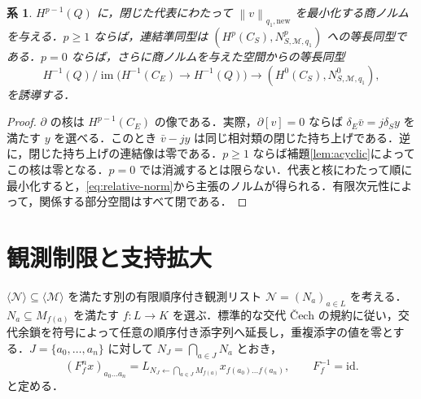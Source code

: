 \documentclass[11pt,a4paper]{article}
\numberwithin{equation}{section}
\theoremstyle{japanese}
\newtheorem{corollary}[theorem]{系}
\theoremstyle{remark}
\newcommand{\M}{\mathcal M}
\newcommand{\im}{\operatorname{im}}
\newcommand{\id}{\mathrm{id}}
\newcommand{\norm}[1]{\left\lVert #1\right\rVert}
\begin{document}
\begin{corollary}\label{cor:relative-isometry}
$H^{p-1}(Q)$ に，閉じた代表にわたって $\norm{v}_{q_1,\mathrm{new}}$ を最小化する商ノルムを与える．$p\ge1$ ならば，連結準同型は $(H^p(C_S),N^p_{S,\M,q_1})$ への等長同型である．$p=0$ ならば，さらに商ノルムを与えた空間からの等長同型
\[
 H^{-1}(Q)/\im\bigl(H^{-1}(C_E)\to H^{-1}(Q)\bigr)
 \longrightarrow (H^0(C_S),N^0_{S,\M,q_1}),
\]
を誘導する．
\end{corollary}
\begin{proof}
$\partial$ の核は $H^{p-1}(C_E)$ の像である．実際，$\partial[v]=0$ ならば $\delta_E\bar v=j\delta_Sy$ を満たす $y$ を選べる．このとき $\bar v-jy$ は同じ相対類の閉じた持ち上げである．逆に，閉じた持ち上げの連結像は零である．$p\ge1$ ならば補題\ref{lem:acyclic}によってこの核は零となる．$p=0$ では消滅するとは限らない．代表と核にわたって順に最小化すると，\eqref{eq:relative-norm}から主張のノルムが得られる．有限次元性によって，関係する部分空間はすべて閉である．
\end{proof}

\section{観測制限と支持拡大}\label{sec:comparison}
$\langle\mathcal N\rangle\subseteq\langle\M\rangle$ を満たす別の有限順序付き観測リスト $\mathcal N=(N_a)_{a\in L}$ を考える．$N_a\subseteq M_{f(a)}$ を満たす $f:L\to K$ を選ぶ．標準的な交代 {\latinfont\v{C}ech} の規約に従い，交代余鎖を符号によって任意の順序付き添字列へ延長し，重複添字の値を零とする\cite[Tag~01FG]{Stacks}．$J=\{a_0,\ldots,a_n\}$ に対して $N_J=\bigcap_{a\in J}N_a$ とおき，
\begin{equation}\label{eq:restriction}
 (F_f^nx)_{a_0\ldots a_n}
 =L_{N_J\leftarrow\bigcap_{a\in J}M_{f(a)}}x_{f(a_0)\ldots f(a_n)},
 \qquad F_f^{-1}=\id.
\end{equation}
と定める．
\end{document}
